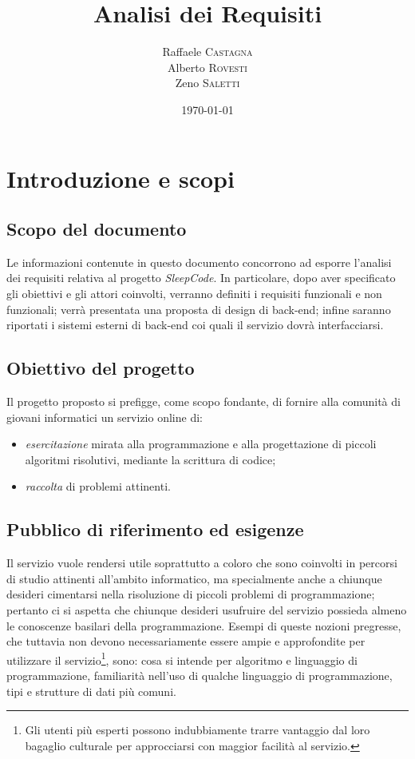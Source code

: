 \documentclass[11pt, a4paper]{article}
\title{Analisi dei Requisiti}
\author{Raffaele \textsc{Castagna}\\
Alberto \textsc{Rovesti}\\
Zeno \textsc{Saletti}}
\date{\today}
\theoremstyle{definition}
\begin{document}


\tableofcontents


\newpage
\section{Introduzione e scopi}
\subsection{Scopo del documento}
Le informazioni contenute in questo documento concorrono ad esporre l'analisi
dei requisiti relativa al progetto \textit{SleepCode}. In particolare, dopo
aver specificato gli obiettivi e gli attori coinvolti, verranno definiti i requisiti
funzionali e non funzionali; verrà presentata una proposta di design di
back-end; infine saranno riportati i sistemi esterni di back-end coi quali il servizio
dovrà interfacciarsi.


\subsection{Obiettivo del progetto}
Il progetto proposto si prefigge, come scopo fondante, di fornire alla comunità
di giovani informatici un servizio online di:
\begin{itemize}
    \item \textit{esercitazione} mirata alla programmazione e alla progettazione
    di piccoli algoritmi risolutivi, mediante la scrittura di codice;
    \item \textit{raccolta} di problemi attinenti.
\end{itemize}

\subsection{Pubblico di riferimento ed esigenze}
Il servizio vuole rendersi utile soprattutto a coloro che sono coinvolti
in percorsi di studio attinenti all'ambito informatico, ma specialmente anche
a chiunque desideri cimentarsi nella risoluzione di piccoli problemi di
programmazione; pertanto ci si aspetta che chiunque desideri usufruire del
servizio possieda almeno le conoscenze basilari della programmazione. Esempi
di queste nozioni pregresse, che tuttavia non devono necessariamente essere ampie e approfondite per utilizzare il servizio\footnote{Gli utenti più esperti possono indubbiamente trarre vantaggio dal loro bagaglio culturale per
approcciarsi con maggior facilità al servizio.}, sono: cosa si intende per
algoritmo e linguaggio di programmazione, familiarità nell'uso di qualche
linguaggio di programmazione, tipi e strutture di dati più comuni.
\end{document}
